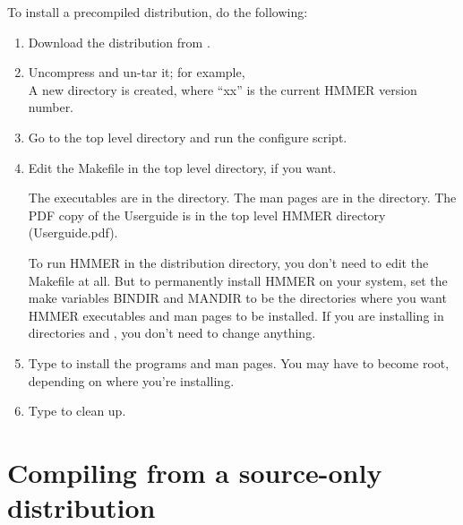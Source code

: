 To install a precompiled distribution, do the following:

\begin{enumerate}
\item Download the distribution from .

\item Uncompress and un-tar it; for example, \\
	A new directory  is created, where ``xx'' is
	the current HMMER version number.
\item Go to the top level directory and run the
      configure script.\\
\item Edit the Makefile in the top level directory, if you want.

The executables are in the  directory. The man pages
are in the  directory.  The PDF copy of the
Userguide is in the top level HMMER directory (Userguide.pdf).

To run HMMER in the distribution directory, you don't need
to edit the Makefile at all. But to permanently install HMMER on your
system, set the make variables BINDIR and MANDIR to be the directories
where you want HMMER executables and man pages to be installed. If you
are installing in directories  and
,
you don't need to change anything.

\item Type  to install the programs and man pages. 
You may have to become root, depending on where you're installing.

\item Type  to clean up.
\end{enumerate}

\section{Compiling from a source-only distribution}

